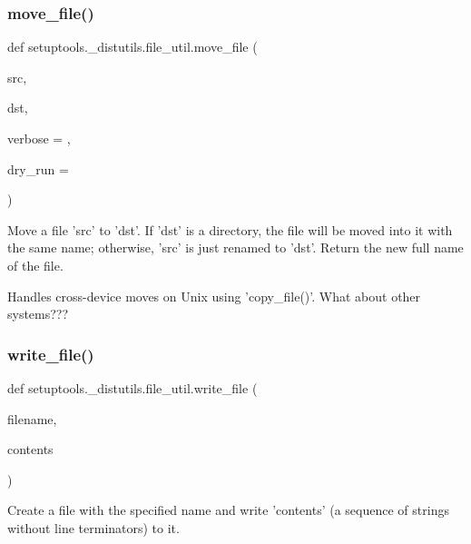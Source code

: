 \subsubsection{\texorpdfstring{move\+\_\+file()}{move\_file()}}
{\footnotesize\ttfamily def setuptools.\+\_\+distutils.\+file\+\_\+util.\+move\+\_\+file (\begin{DoxyParamCaption}\item[{}]{src,  }\item[{}]{dst,  }\item[{}]{verbose = {},  }\item[{}]{dry\+\_\+run = {} }\end{DoxyParamCaption})}

\begin{DoxyVerb}Move a file 'src' to 'dst'.  If 'dst' is a directory, the file will
be moved into it with the same name; otherwise, 'src' is just renamed
to 'dst'.  Return the new full name of the file.

Handles cross-device moves on Unix using 'copy_file()'.  What about
other systems???
\end{DoxyVerb}
 \mbox{\label{namespacesetuptools_1_1__distutils_1_1file__util_adcd060df375bd14841dc01abfa7afcd5}} 
\subsubsection{\texorpdfstring{write\+\_\+file()}{write\_file()}}
{\footnotesize\ttfamily def setuptools.\+\_\+distutils.\+file\+\_\+util.\+write\+\_\+file (\begin{DoxyParamCaption}\item[{}]{filename,  }\item[{}]{contents }\end{DoxyParamCaption})}

\begin{DoxyVerb}Create a file with the specified name and write 'contents' (a
sequence of strings without line terminators) to it.
\end{DoxyVerb}
 